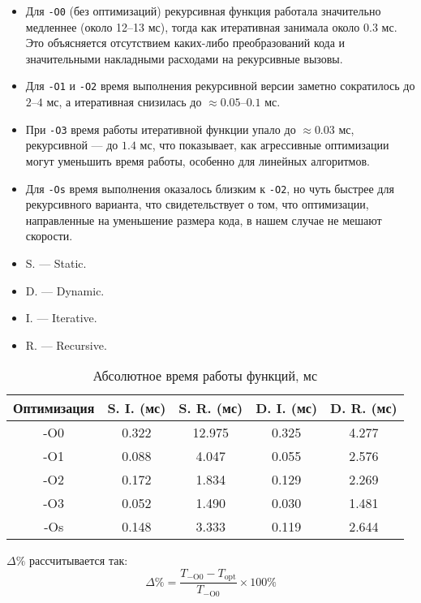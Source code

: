 \begin{itemize}
    \item Для \texttt{-O0} (без оптимизаций) рекурсивная функция работала значительно медленнее (около 12--13 мс), тогда как итеративная занимала около $0.3$ мс. Это объясняется отсутствием каких-либо преобразований кода и значительными накладными расходами на рекурсивные вызовы.
    
    \item Для \texttt{-O1} и \texttt{-O2} время выполнения рекурсивной версии заметно сократилось до $2$--$4$ мс, а итеративная снизилась до $\approx 0.05$--$0.1$ мс.
    
    \item При \texttt{-O3} время работы итеративной функции упало до $\approx 0.03$ мс, рекурсивной — до $1.4$ мс, что показывает, как агрессивные оптимизации могут уменьшить время работы, особенно для линейных алгоритмов.
    
    \item Для \texttt{-Os} время выполнения оказалось близким к \texttt{-O2}, но чуть быстрее для рекурсивного варианта, что свидетельствует о том, что оптимизации, направленные на уменьшение размера кода, в нашем случае не мешают скорости.
\end{itemize}
\begin{itemize}
  \item S. --- Static.
  \item D. --- Dynamic.
  \item I. --- Iterative.
  \item R. --- Recursive.
\end{itemize}

\begin{table}[H]
\centering
\caption{Абсолютное время работы функций, мс}
\begin{tabular}{|c|c|c|c|c|}
\hline
Оптимизация & S. I. (мс) & S. R. (мс) & D. I. (мс) & D. R. (мс)\\
\hline
-O0 & 0.322 & 12.975 & 0.325 & 4.277 \\
-O1 & 0.088 & 4.047 & 0.055 & 2.576 \\
-O2 & 0.172 & 1.834 & 0.129 & 2.269 \\
-O3 & 0.052 & 1.490 & 0.030 & 1.481 \\
-Os & 0.148 & 3.333 & 0.119 & 2.644 \\
\hline
\end{tabular}
\end{table}

\noindent $\Delta\%$ рассчитывается так:
\[
\Delta\% = \frac{T_{\mathrm{-O0}} - T_{\mathrm{opt}}}{T_{\mathrm{-O0}}} \times 100\%
\]

